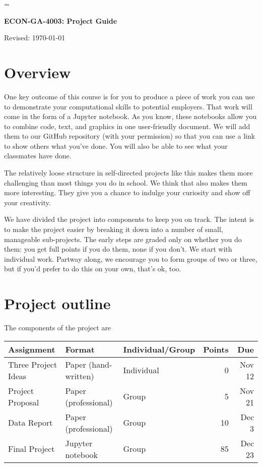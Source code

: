 \documentclass[11pt]{article}
\begin{document}
\parskip=\bigskipamount
\parindent=0.0in
\thispagestyle{empty}


\bigskip\bigskip
\centerline{\Large \bf ECON-GA-4003:  Project Guide}
\centerline{Revised: \today}

\section*{Overview}

One key outcome of this course is for you to produce a piece of work you can use
to demonstrate your computational skills to potential employers. That work will
come in the form of a Jupyter notebook. As you know, these
notebooks allow you to combine code, text, and graphics in one user-friendly
document. We will add them to our GitHub repository (with your permission) so that you can use a link
to show others what you've done. You will also be able to see what your
classmates have done.

The relatively loose structure in self-directed projects like this makes them
more challenging than most things you do in school. We think that also makes
them more interesting. They give you a chance to indulge your curiosity and show
off your creativity.

We have divided the project into components to keep you on track. The intent is
to make the project easier by breaking it down into a number of small,
manageable sub-projects. The early steps are graded only on whether you do them:
you get full points if you do them, none if you don't. We start with individual
work.  Partway along, we encourage you to form groups of two or three, but if
you'd prefer to do this on your own, that's ok, too.


\section*{Project outline}

The components of the project are
%
\begin{center}
\begin{tabular}{lllrr}
\toprule
Assignment                  & Format  & Individual/Group &  Points & Due \\
\midrule
Three Project Ideas         & Paper (hand-written)  & Individual  & 0 & Nov 12 \\
Project Proposal            & Paper (professional)  & Group       & 5 & Nov 21 \\
Data Report                 & Paper (professional)  & Group       & 10 & Dec 3 \\
Final Project               & Jupyter notebook      & Group       & 85 & Dec 23\\
\bottomrule
\end{tabular}
\end{center}
\end{document}
